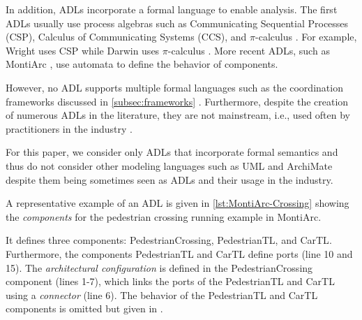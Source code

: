 \documentclass[runningheads]{llncs}
\begin{document}
In addition, ADLs incorporate a formal language to enable analysis.
The first ADLs usually use process algebras such as Communicating Sequential Processes (CSP), Calculus of Communicating Systems (CCS), and $\pi$-calculus \cite{ozkayaAreWeThere2013}.
For example, Wright uses CSP \cite{allenFormalBasisArchitectural1997} while Darwin uses $\pi$-calculus \cite{mageeSpecifyingDistributedSoftware1995}.
More recent ADLs, such as MontiArc \cite{haberMontiArcArchitecturalModeling2014}, use automata to define the behavior of components.

However, no ADL supports multiple formal languages such as the coordination frameworks discussed in \autoref{subsec:frameworks} \cite{medvidovicClassificationComparisonFramework2000}.
Furthermore, despite the creation of numerous ADLs in the literature, they are not mainstream, i.e., used often by practitioners in the industry \cite{clementsSurveyArchitectureDescription1996,woodsArchitectureDescriptionLanguages2005,pandeyArchitecturalDescriptionLanguages2010,ozkayaAreWeThere2013}.

For this paper, we consider only ADLs that incorporate formal semantics and thus do not consider other modeling languages such as UML \cite{objectmanagementgroupUnifiedModelingLanguage2017} and ArchiMate \cite{theopengroupArchiMateSpecification2023} despite them being sometimes seen as ADLs and their usage in the industry.

A representative example of an ADL is given in  \autoref{lst:MontiArc-Crossing} showing the \textit{components} for the pedestrian crossing running example in MontiArc.



It defines three components: \textsf{PedestrianCrossing}, \textsf{PedestrianTL}, and \textsf{CarTL}.
Furthermore, the components \textsf{PedestrianTL} and \textsf{CarTL} define ports (line 10 and 15).
The \textit{architectural configuration} is defined in the \textsf{PedestrianCrossing} component (lines 1-7), which links the ports of the \textsf{PedestrianTL} and \textsf{CarTL} using a \textit{connector} (line 6).
The behavior of the \textsf{PedestrianTL} and \textsf{CarTL} components is omitted but given in \cite{timkrauterArtifactsCoordination2024}.
\end{document}
